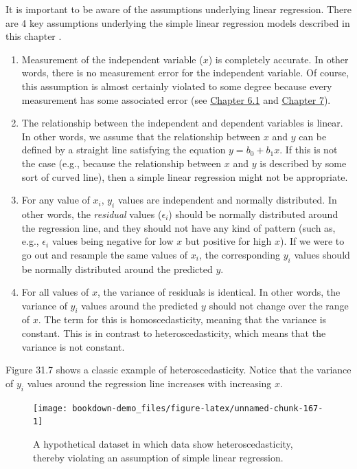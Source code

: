 \documentclass[
]{scrbook}
\begin{document}
It is important to be aware of the assumptions underlying linear regression.
There are 4 key assumptions underlying the simple linear regression models described in this chapter \citep{Sokal1995}.

\begin{enumerate}
\def\labelenumi{\arabic{enumi}.}
\item
  Measurement of the independent variable (\(x\)) is completely accurate. In other words, there is no measurement error for the independent variable.
  Of course, this assumption is almost certainly violated to some degree because every measurement has some associated error (see \protect\hyperlink{accuracy}{Chapter 6.1} and \protect\hyperlink{Chapter_7}{Chapter 7}).
\item
  The relationship between the independent and dependent variables is linear.
  In other words, we assume that the relationship between \(x\) and \(y\) can be defined by a straight line satisfying the equation \(y = b_{0} + b_{1}x\).
  If this is not the case (e.g., because the relationship between \(x\) and \(y\) is described by some sort of curved line), then a simple linear regression might not be appropriate.
\item
  For any value of \(x_{i}\), \(y_{i}\) values are independent and normally distributed.
  In other words, the \emph{residual} values (\(\epsilon_{i}\)) should be normally distributed around the regression line, and they should not have any kind of pattern (such as, e.g., \(\epsilon_{i}\) values being negative for low \(x\) but positive for high \(x\)).
  If we were to go out and resample the same values of \(x_{i}\), the corresponding \(y_{i}\) values should be normally distributed around the predicted \(y\).
\item
  For all values of \(x\), the variance of residuals is identical.
  In other words, the variance of \(y_{i}\) values around the predicted \(y\) should not change over the range of \(x\).
  The term for this is homoscedasticity, meaning that the variance is constant.
  This is in contrast to heteroscedasticity, which means that the variance is not constant.
\end{enumerate}

Figure 31.7 shows a classic example of heteroscedasticity.
Notice that the variance of \(y_{i}\) values around the regression line increases with increasing \(x\).

\begin{figure}
\texttt{[image: bookdown-demo\_files/figure-latex/unnamed-chunk-167-1]} \caption{A hypothetical dataset in which data show heteroscedasticity, thereby violating an assumption of simple linear regression.}\label{fig:unnamed-chunk-167}
\end{figure}
\end{document}
